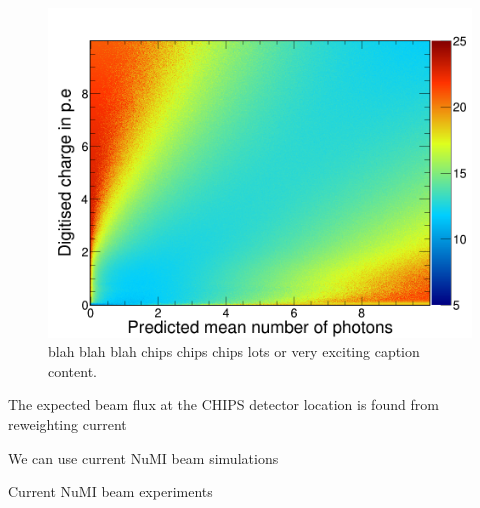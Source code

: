 \begin{figure}
    \includegraphics[width=\largefigwidth]{diagrams/cvn/digi_likelihood}
    \caption[digi_likelihood]%
    {blah blah blah chips chips chips lots or very exciting caption content.}
    \label{fig:digi_likelihood}
\end{figure}

The expected beam flux at the CHIPS detector location is found from reweighting current

We can use current NuMI beam simulations

Current NuMI beam experiments

